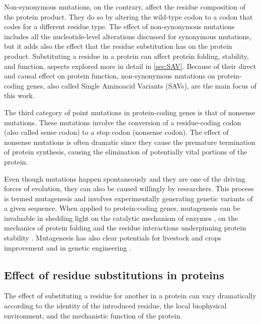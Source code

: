 Non-synonymous mutations, on the contrary, affect the residue composition of the protein product.
They do so by altering the wild-type codon to a codon that codes for a different residue type.
The effect of non-synonymous mutations includes all the nucleotide-level alterations discussed for synonymous mutations, but it adds also the effect that the residue substitution has on the protein product.
Substituting a residue in a protein can affect protein folding, stability, and function, aspects explored more in detail in \autoref{sec:SAV}.
Because of their direct and causal effect on protein function, non-synonymous mutations on protein-coding genes, also called Single Aminoacid Variants (SAVs), are the main focus of this work.

The third category of point mutations in protein-coding genes is that of nonsense mutations.
These mutations involve the conversion of a residue-coding codon (also called sense codon) to a stop codon (nonsense codon).
The effect of nonsense mutations is often dramatic since they cause the premature termination of protein synthesis, causing the elimination of potentially vital portions of the protein.

Even though mutations happen spontaneously and they are one of the driving forces of evolution, they can also be caused willingly by researchers.
This process is termed mutagenesis and involves experimentally generating genetic variants of a given sequence.
When applied to protein-coding genes, mutagenesis can be invaluable in shedding light on the catalytic mechanism of enzymes \parencite{Peracchi2001}, on the mechanics of protein folding and the residue interactions underpinning protein stability \parencite{Nisthal2019}.
Mutagenesis has also clear potentials for livestock and crops improvement and in genetic engineering \parencite{Davies1988, Holme2019, Kalds2019}.

\subsection{Effect of residue substitutions in proteins}\label{sec:SAV}

The effect of substituting a residue for another in a protein can vary dramatically according to the identity of the introduced residue, the local biophysical environment, and the mechanistic function of the protein.

